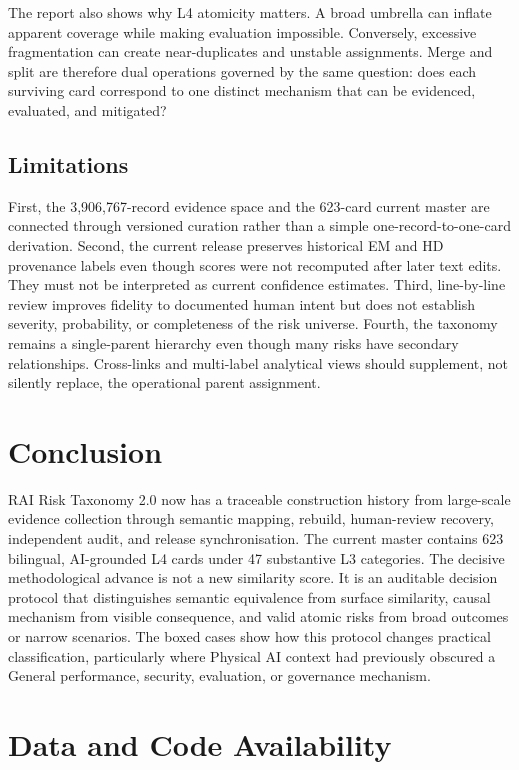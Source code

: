 \documentclass[10pt,a4paper]{article}
\begin{document}
The report also shows why L4 atomicity matters. A broad umbrella can inflate apparent coverage while making evaluation impossible. Conversely, excessive fragmentation can create near-duplicates and unstable assignments. Merge and split are therefore dual operations governed by the same question: does each surviving card correspond to one distinct mechanism that can be evidenced, evaluated, and mitigated?

\subsection{Limitations}

First, the 3,906,767-record evidence space and the 623-card current master are connected through versioned curation rather than a simple one-record-to-one-card derivation. Second, the current release preserves historical EM and HD provenance labels even though scores were not recomputed after later text edits. They must not be interpreted as current confidence estimates. Third, line-by-line review improves fidelity to documented human intent but does not establish severity, probability, or completeness of the risk universe. Fourth, the taxonomy remains a single-parent hierarchy even though many risks have secondary relationships. Cross-links and multi-label analytical views should supplement, not silently replace, the operational parent assignment.

\section{Conclusion}

RAI Risk Taxonomy 2.0 now has a traceable construction history from large-scale evidence collection through semantic mapping, rebuild, human-review recovery, independent audit, and release synchronisation. The current master contains 623 bilingual, AI-grounded L4 cards under 47 substantive L3 categories. The decisive methodological advance is not a new similarity score. It is an auditable decision protocol that distinguishes semantic equivalence from surface similarity, causal mechanism from visible consequence, and valid atomic risks from broad outcomes or narrow scenarios. The boxed cases show how this protocol changes practical classification, particularly where Physical AI context had previously obscured a General performance, security, evaluation, or governance mechanism.

\section*{Data and Code Availability}
\end{document}
